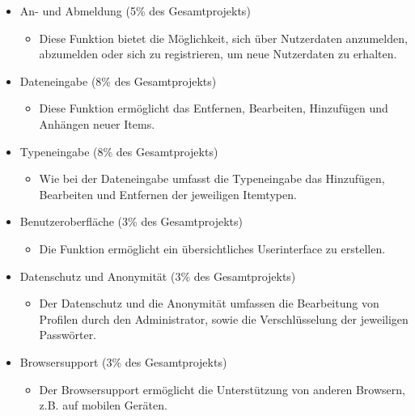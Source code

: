 \documentclass[11pt,a4paper]{report}
\begin{document}
\begin{itemize}
\itemsep1pt\parskip0pt
\item
  An- und Abmeldung (5\% des Gesamtprojekts)

  \begin{itemize}
  \item
    Diese Funktion bietet die Möglichkeit, sich über Nutzerdaten anzumelden, abzumelden
    oder sich zu registrieren, um neue Nutzerdaten zu erhalten.
  \end{itemize}
  
\item
  Dateneingabe (8\% des Gesamtprojekts)

  \begin{itemize}
  \item
    Diese Funktion ermöglicht das Entfernen, Bearbeiten, Hinzufügen und Anhängen neuer
    Items.
  \end{itemize}
  
\item
  Typeneingabe (8\% des Gesamtprojekts)

  \begin{itemize}
  \item
    Wie bei der Dateneingabe umfasst die Typeneingabe das Hinzufügen,
    Bearbeiten und Entfernen der jeweiligen Itemtypen.
  \end{itemize}
  
\item
  Benutzeroberfläche (3\% des Gesamtprojekts)

  \begin{itemize}
  \item
    Die Funktion ermöglicht ein übersichtliches Userinterface zu erstellen.
  \end{itemize}
\item
  Datenschutz und Anonymität (3\% des Gesamtprojekts)

  \begin{itemize}
  \item
    Der Datenschutz und die Anonymität umfassen die Bearbeitung von
    Profilen durch den Administrator, sowie die Verschlüsselung der
    jeweiligen Passwörter.
  \end{itemize}
  \item
  Browsersupport (3\% des Gesamtprojekts)

  \begin{itemize}
  \item
    Der Browsersupport ermöglicht die Unterstützung von anderen Browsern, z.B. auf mobilen
    Geräten.
  \end{itemize}
  

\end{itemize}
\end{document}
